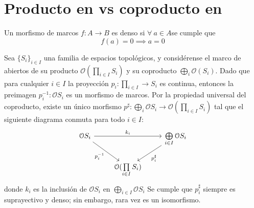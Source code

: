 \section{Producto en  vs coproducto en }
\begin{definition}
    Un morfismo de marcos $f:A\to B$ es denso si $\forall \ a\in A$se cumple que
    $$f(a)=0\implies a=0$$
\end{definition}
Sea $\{S_i\}_{i\in I}$ una familia de espacios topológicos, y considérense el marco de abiertos de su producto $\mathcal{O}(\prod\limits_{i\in I}S_i)$ y su coproducto $\bigoplus\limits_{i}\mathcal{O}(S_i)$. Dado que para cualquier $i\in I$ la proyección $p_i:\prod\limits_{i\in I}\to S_i$ es continua, entonces la preimagen $p_i^{-1}:\mathcal{O}S_i$
es un morfismo de marcos. Por la propiedad universal del coproducto, existe un único morfismo $p^\sharp:\bigoplus\limits_{i}\mathcal{O}S_i\to\mathcal{O}(\prod\limits_{i\in I}S_i)$ tal que el siguiente diagrama conmuta para todo $i\in I$:
 \[
            \begin{tikzcd}
                \mathcal{O}S_i \ar[dr,"p_i^{-1}"'] \ar[rr,"k_i"] && \bigoplus\limits_{i\in I}\mathcal{O}S_i \ar[dl,"p_i^\sharp"]
                \\ & \mathcal{O}(\prod\limits_{i\in I}S_i)
            \end{tikzcd}
        \]
donde $k_i$ es la inclusión de $\mathcal{O}S_i$ en $\bigoplus\limits_{i\in I}\mathcal{O}S_i$
Se cumple que $p_i^\sharp$ siempre es suprayectivo y denso; sin embargo, rara vez es un isomorfismo.
